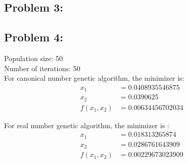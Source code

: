 \documentclass{article}
\begin{document}
\subsection*{{Problem 3: }}



\subsection*{{Problem 4: }}

Population size:  50  \\
Number of iterations:  50 \\ 
For canonical number genetic algorithm, the minimizer is: \\
\begin{align*}
x_1 & = 0.0408935546875 \\
x_2 & = 0.0390625  \\
f(x_1,x_2)  & = 0.00634456702034
\end{align*}

For real number genetic algorithm, the minimizer is : \\
\begin{align*} 
x_1 & = 0.018313265874 \\
x_2 & = 0.0286761643909 \\
f(x_1, x_2) & = 0.00229673023909
\end{align*} 
\end{document}
